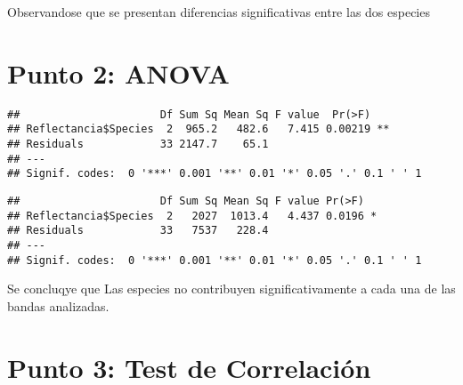 \documentclass[
]{article}
\newenvironment{Shaded}{\begin{snugshade}}{\end{snugshade}}
\newcommand{\KeywordTok}[1]{\textcolor[rgb]{0.13,0.29,0.53}{\textbf{#1}}}
\newcommand{\NormalTok}[1]{#1}
\newcommand{\OperatorTok}[1]{\textcolor[rgb]{0.81,0.36,0.00}{\textbf{#1}}}
\newcommand{\StringTok}[1]{\textcolor[rgb]{0.31,0.60,0.02}{#1}}
\begin{document}
Observandose que se presentan diferencias significativas entre las dos
especies

\hypertarget{punto-2-anova}{%
\section{Punto 2: ANOVA}\label{punto-2-anova}}

\begin{Shaded}
\end{Shaded}

\begin{verbatim}
##                      Df Sum Sq Mean Sq F value  Pr(>F)   
## Reflectancia$Species  2  965.2   482.6   7.415 0.00219 **
## Residuals            33 2147.7    65.1                   
## ---
## Signif. codes:  0 '***' 0.001 '**' 0.01 '*' 0.05 '.' 0.1 ' ' 1
\end{verbatim}

\begin{Shaded}
\end{Shaded}

\begin{verbatim}
##                      Df Sum Sq Mean Sq F value Pr(>F)  
## Reflectancia$Species  2   2027  1013.4   4.437 0.0196 *
## Residuals            33   7537   228.4                 
## ---
## Signif. codes:  0 '***' 0.001 '**' 0.01 '*' 0.05 '.' 0.1 ' ' 1
\end{verbatim}

Se concluqye que Las especies no contribuyen significativamente a cada
una de las bandas analizadas.

\hypertarget{punto-3-test-de-correlaciuxf3n}{%
\section{Punto 3: Test de
Correlación}\label{punto-3-test-de-correlaciuxf3n}}
\end{document}
